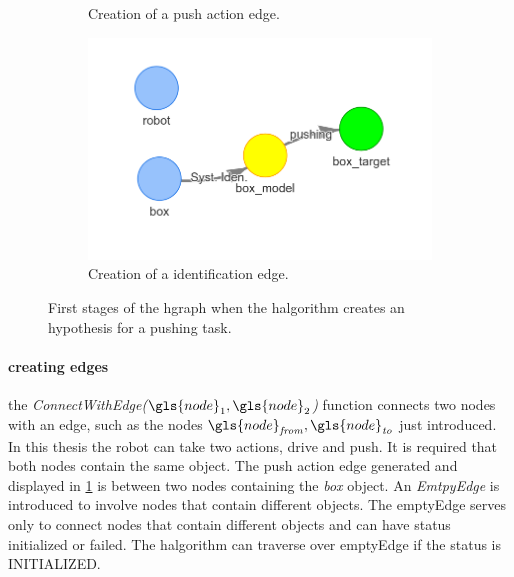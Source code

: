 \begin{figure}[h]
\begin{subfigure}{.32\textwidth}
    \caption{Creation of a push action edge.}\label{subfig:robot_push_2}
    \end{subfigure}
    \begin{subfigure}{.35\textwidth}
    \includegraphics[width=1.2\textwidth]{figures/proposed_method/connecting_nodes/robot_push/robot_push_2}
    \caption{Creation of a identification edge.}\label{subfig:robot_push_3}
    \end{subfigure}
    \caption{First stages of the \ac{hgraph} when the \ac{halgorithm} creates an hypothesis for a pushing task.}%
    \label{fig:robot_push_1}
\end{figure}

\paragraph{creating edges}
the \textit{ConnectWithEdge($\gls{node}_1, \gls{node}_2$)} function connects two nodes with an edge, such as the nodes $\gls{node}_\mathit{from}, \gls{node}_\mathit{to}$ just introduced. In this thesis the robot can take two actions, drive and push. It is required that both nodes contain the same object. The push action edge generated and displayed in \cref{subfig:robot_push_2} is between two nodes containing the \textit{box} object. An \textit{EmtpyEdge} is introduced to involve nodes that contain different objects. The emptyEdge serves only to connect nodes that contain different objects and can have status initialized or failed. The \ac{halgorithm} can traverse over emptyEdge if the status is INITIALIZED.\bs

